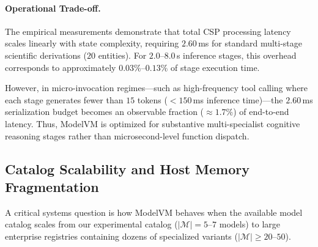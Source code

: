 \begin{table}[htbp]
\small
\centering
\caption{Computational CPU Overhead of Typed CSP Serialization and Validation across State Entity Volumes ($n=100$ trials).}
\label{tab:csp_overhead}
\end{table}

\paragraph{Operational Trade-off.}
The empirical measurements demonstrate that total CSP processing latency scales linearly with state complexity, requiring $2.60$\,ms for standard multi-stage scientific derivations ($20$ entities). For $2.0\text{--}8.0$\,s inference stages, this overhead corresponds to approximately $0.03\%\text{--}0.13\%$ of stage execution time. 

However, in micro-invocation regimes—such as high-frequency tool calling where each stage generates fewer than $15$ tokens ($< 150$\,ms inference time)—the $2.60$\,ms serialization budget becomes an observable fraction ($\approx 1.7\%$) of end-to-end latency. Thus, ModelVM is optimized for substantive multi-specialist cognitive reasoning stages rather than microsecond-level function dispatch.

\subsection{Catalog Scalability and Host Memory Fragmentation}
\label{sec:lim_catalog_scaling}

A critical systems question is how ModelVM behaves when the available model catalog scales from our experimental catalog ($|\mathcal{M}| = 5\text{--}7$ models) to large enterprise registries containing dozens of specialized variants ($|\mathcal{M}| \ge 20\text{--}50$).

